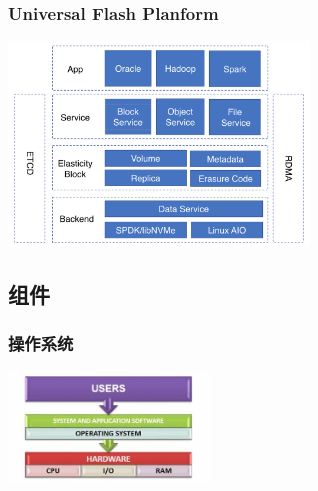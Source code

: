 \documentclass[UTF8,8pt,xcolor=dvipsnames]{beamer}
\begin{document}
\begin{frame}[fragile]
    \frametitle{Universal Flash Planform}
    \begin{center}
        \includegraphics[width=0.6\textwidth]{../imgs/universal-flash.png}
    \end{center}
\end{frame}

\subsection{组件}

\begin{frame}[fragile]
    \frametitle{操作系统}
    \begin{center}
        \includegraphics[width=0.4\textwidth]{../imgs/operating-system.jpeg}
    \end{center}
\end{frame}
\end{document}
